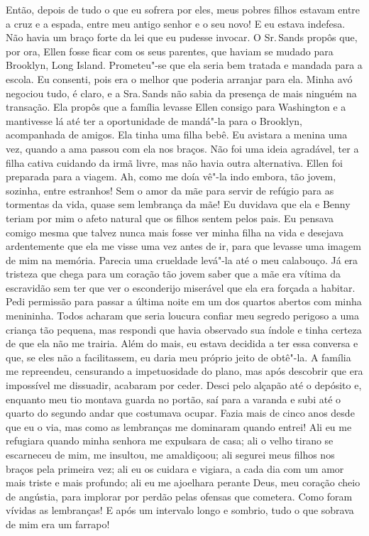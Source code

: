 Então, depois de tudo o que eu sofrera
por eles, meus pobres filhos estavam entre a cruz e a espada, entre meu
antigo senhor e o seu novo! E eu estava indefesa. Não havia um braço
forte da lei que eu pudesse invocar. O Sr.\,Sands propôs que, por ora,
Ellen fosse ficar com os seus parentes, que haviam se mudado para
Brooklyn, Long Island. Prometeu"-se que ela seria bem tratada e mandada
para a escola. Eu consenti, pois era o melhor que poderia arranjar para
ela. Minha avó negociou tudo, é claro, e a Sra.\,Sands não sabia da
presença de mais ninguém na transação. Ela propôs que a família levasse
Ellen consigo para Washington e a mantivesse lá até ter a oportunidade
de mandá"-la para o Brooklyn, acompanhada de amigos. Ela tinha uma filha
bebê. Eu avistara a menina uma vez, quando a ama passou com ela nos
braços. Não foi uma ideia agradável, ter a filha cativa cuidando da irmã
livre, mas não havia outra alternativa. Ellen foi preparada para a
viagem. Ah, como me doía vê"-la indo embora, tão jovem, sozinha, entre
estranhos! Sem o amor da mãe para servir de refúgio para as tormentas da
vida, quase sem lembrança da mãe! Eu duvidava que ela e Benny teriam por
mim o afeto natural que os filhos sentem pelos pais. Eu pensava comigo
mesma que talvez nunca mais fosse ver minha filha na vida e desejava
ardentemente que ela me visse uma vez antes de ir, para que levasse uma
imagem de mim na memória. Parecia uma crueldade levá"-la até o meu
calabouço. Já era tristeza que chega para um coração tão jovem saber que
a mãe era vítima da escravidão sem ter que ver o esconderijo miserável
que ela era forçada a habitar. Pedi permissão para passar a última noite
em um dos quartos abertos com minha menininha. Todos acharam que seria
loucura confiar meu segredo perigoso a uma criança tão pequena, mas
respondi que havia observado sua índole e tinha certeza de que ela não
me trairia. Além do mais, eu estava decidida a ter essa conversa e que,
se eles não a facilitassem, eu daria meu próprio jeito de obtê"-la. A
família me repreendeu, censurando a impetuosidade do plano, mas após
descobrir que era impossível me dissuadir, acabaram por ceder. Desci
pelo alçapão até o depósito e, enquanto meu tio montava guarda no
portão, saí para a varanda e subi até o quarto do segundo andar que
costumava ocupar. Fazia mais de cinco anos desde que eu o via, mas como
as lembranças me dominaram quando entrei! Ali eu me refugiara quando
minha senhora me expulsara de casa; ali o velho tirano se escarneceu de
mim, me insultou, me amaldiçoou; ali segurei meus filhos nos braços pela
primeira vez; ali eu os cuidara e vigiara, a cada dia com um amor mais
triste e mais profundo; ali eu me ajoelhara perante Deus, meu coração
cheio de angústia, para implorar por perdão pelas ofensas que cometera.
Como foram vívidas as lembranças! E após um intervalo longo e sombrio,
tudo o que sobrava de mim era um farrapo!

